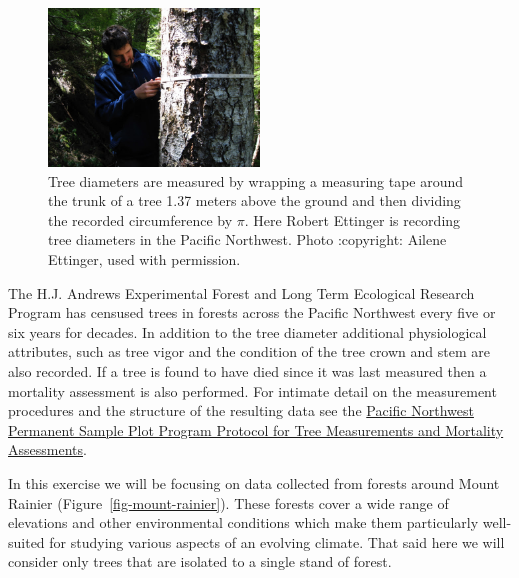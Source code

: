 \documentclass[
  letterpaper,
  DIV=11,
  numbers=noendperiod]{scrartcl}
\begin{document}
\begin{figure}

{\centering \includegraphics[width=0.5\textwidth,height=\textheight]{figures/photos/diameter_measurement_ii.jpg}

}

\caption{\label{fig-diameter-measurement}Tree diameters are measured by
wrapping a measuring tape around the trunk of a tree 1.37 meters above
the ground and then dividing the recorded circumference by \(\pi\). Here
Robert Ettinger is recording tree diameters in the Pacific Northwest.
Photo :copyright: Ailene Ettinger, used with permission.}

\end{figure}

The H.J. Andrews Experimental Forest and Long Term Ecological Research
Program has censused trees in forests across the Pacific Northwest every
five or six years for decades. In addition to the tree diameter
additional physiological attributes, such as tree vigor and the
condition of the tree crown and stem are also recorded. If a tree is
found to have died since it was last measured then a mortality
assessment is also performed. For intimate detail on the measurement
procedures and the structure of the resulting data see the
\href{https://github.com/lizzieinvancouver/bayesian2024ubc/tree/main/data/treestands/metadata/PSP_tree_measurement_protocol_v2019.pdf}{Pacific
Northwest Permanent Sample Plot Program Protocol for Tree Measurements
and Mortality Assessments}.

In this exercise we will be focusing on data collected from forests
around Mount Rainier (Figure~\ref{fig-mount-rainier}). These forests
cover a wide range of elevations and other environmental conditions
which make them particularly well-suited for studying various aspects of
an evolving climate. That said here we will consider only trees that are
isolated to a single stand of forest.
\end{document}
